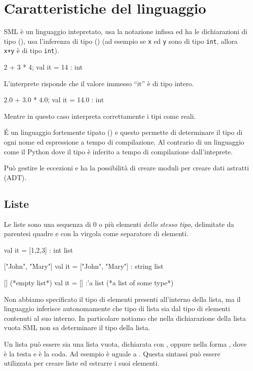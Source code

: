 \documentclass{article}
\begin{document}
\section{Caratteristiche del linguaggio}

SML è un linguaggio intepretato, usa la notazione infissa ed ha le dichiarazioni di tipo (), usa l'inferenza di tipo () (ad esempio se \texttt{x} ed \texttt{y} sono di tipo \texttt{int}, allora \texttt{x+y} è di tipo \texttt{int}).
\begin{smlcode}
2 + 3 * 4;
val it = 14 : int
\end{smlcode}
L'interprete risponde che il valore immesso ``it'' è di tipo intero.
\begin{smlcode}
2.0 + 3.0 * 4.0;
val it = 14.0 : int
\end{smlcode}
Mentre in questo caso interpreta correttamente i tipi come reali.

\'{E} un linguaggio fortemente tipato () e questo permette di determinare il tipo di ogni nome ed espressione a tempo di compilazione.
Al contrario di un linguaggio come il Python dove il tipo è inferito a tempo di compilazione dall'inteprete.

Può gestire le eccezioni e ha la possibilità di creare moduli per creare dati astratti (ADT).

\subsection{Liste}

Le liste sono una sequenza di 0 o più elementi \emph{dello stesso tipo}, delimitate da parentesi quadre e con la virgola come separatore di elementi.

\begin{smlcode}
[1,2,3]
val it = [1,2,3] : int list

["John", "Mary"]
val it = ["John", "Mary"] : string list

[] (*empty list*)
val it = [] :'a list (*a list of some type*)
\end{smlcode}
Non abbiamo specificato il tipo di elementi presenti all'interno della lista, ma il linguaggio inferisce autonomamente che tipo di lista sia dal tipo di elementi contenuti al suo interno.
In particolare notiamo che nella dichiarazione della lista vuota SML non sa determinare il tipo della lista.

Un lista può essere sia una lista vuota, dichiarata con \smlinline{[]}, oppure nella forma , dove  è la testa e  è la coda.
Ad esempio \smlinline{[7]} è uguale a .
Questa sintassi può essere utilizzata per creare liste ed estrarre i suoi elementi.
\end{document}
